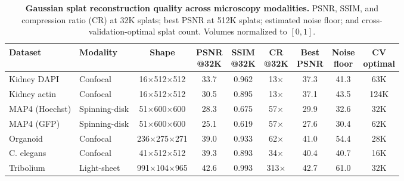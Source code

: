 \begin{table}[t]
\centering
\small
\caption{\textbf{Gaussian splat reconstruction quality across microscopy modalities.} PSNR, SSIM, and compression ratio (CR) at 32K splats; best PSNR at 512K splats; estimated noise floor; and cross-validation-optimal splat count. Volumes normalized to $[0, 1]$.}
\label{tab:summary}
\begin{tabular}{@{}llccccccc@{}}
\toprule
Dataset & Modality & Shape & \makecell{PSNR\\@32K} & \makecell{SSIM\\@32K} & \makecell{CR\\@32K} & \makecell{Best\\PSNR} & \makecell{Noise\\floor} & \makecell{CV\\optimal} \\
\midrule
  Kidney DAPI & Confocal & \footnotesize{16$\times$512$\times$512} & 33.7 & 0.962 & 13$\times$ & 37.3 & 41.3 & 63K \\
  Kidney actin & Confocal & \footnotesize{16$\times$512$\times$512} & 30.5 & 0.895 & 13$\times$ & 37.1 & 43.5 & 124K \\
  MAP4 (Hoechst) & Spinning-disk & \footnotesize{51$\times$600$\times$600} & 28.3 & 0.675 & 57$\times$ & 29.9 & 32.6 & 32K \\
  MAP4 (GFP) & Spinning-disk & \footnotesize{51$\times$600$\times$600} & 25.1 & 0.619 & 57$\times$ & 27.6 & 30.4 & 62K \\
  Organoid & Confocal & \footnotesize{236$\times$275$\times$271} & 39.0 & 0.933 & 62$\times$ & 41.0 & 54.4 & 28K \\
  C. elegans & Confocal & \footnotesize{41$\times$512$\times$512} & 39.3 & 0.893 & 34$\times$ & 40.4 & 40.7 & 16K \\
  Tribolium & Light-sheet & \footnotesize{991$\times$104$\times$965} & 42.6 & 0.993 & 313$\times$ & 42.7 & 61.0 & 32K \\
\bottomrule
\end{tabular}
\end{table}
